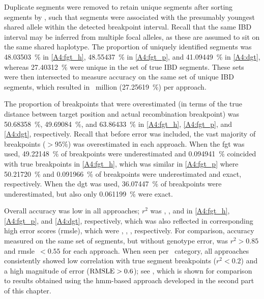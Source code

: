 Duplicate segments were removed to retain unique segments after sorting segments by \fk{}, such that segments were associated with the presumably youngest shared allele within the detected breakpoint interval.
Recall that the same IBD interval may be inferred from multiple focal alleles, as these are assumed to sit on the same shared haplotype.
The proportion of uniquely identified segments was \SI{48.03503}{\percent} in \cref{A4:fgt_h},
\SI{48.55437}{\percent} in \cref{A4:fgt_p}, and \SI{41.09449}{\percent} in \cref{A4:dgt}, whereas
\SI{27.40312}{\percent} were unique in the set of true IBD segments.
These sets were then intersected to measure accuracy on the same set of unique IBD segments, which resulted in ~million (\SI{27.25619}{\percent}) per approach.

%

%

The proportion of breakpoints that were overestimated (in terms of the true distance between target position and actual recombination breakpoint) was
\SI{50.68358}{\percent}, \SI{49.69084}{\percent}, and \SI{63.86433}{\percent} in \ref{A4:fgt_h}, \ref{A4:fgt_p}, and \ref{A4:dgt}, respectively.
Recall that before error was included, the vast majority of breakpoints (${>95\%}$) was overestimated in each approach.
When the \gls{fgt} was used, \SI{49.22148}{\percent} of breakpoints were underestimated and \SI{0.094941}{\percent} coincided with true breakpoints in \cref{A4:fgt_h}, which was similar in \cref{A4:fgt_p} where \SI{50.21720}{\percent} and \SI{0.091966}{\percent} of breakpoints were underestimated and exact, respectively.
When the \gls{dgt} was used, \SI{36.07447}{\percent} of breakpoints were underestimated, but also only \SI{0.061199}{\percent} were exact.

Overall accuracy was low in all approaches; $r^2$ was , , and  in \ref{A4:fgt_h}, \ref{A4:fgt_p}, and \ref{A4:dgt}, respectively, which was also reflected in corresponding high error scores (\gls{rmsle}), which were , , , respectively.
For comparison, accuracy measured on the same set of segments, but without genotype error, was ${r^2 > 0.85}$ and \gls{rmsle}~${< 0.55}$ for each approach.
When seen per \fk{}~category, all  approaches consistently showed low correlation with true segment breakpoints (${r^2 < 0.2}$) and a high magnitude of error (${\operatorname*{RMSLE} > 0.6}$); see , which is shown for comparison to results obtained using the \gls{hmm}-based approach developed in the second part of this chapter.

